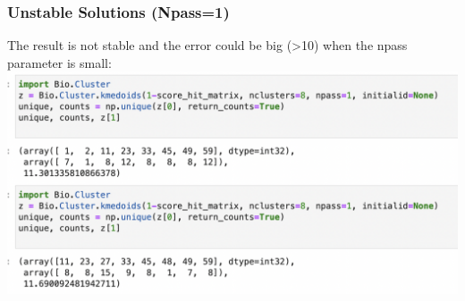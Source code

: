 \documentclass[a4paper, 12pt, one column]{article}
\begin{document}
\subsubsection*{Unstable Solutions (Npass=1)}
The result is not stable and the error could be big (>10) when the npass parameter is small: \\
\includegraphics [width=.8\linewidth] {clustering_result_npass1.png} \\
\end{document}
